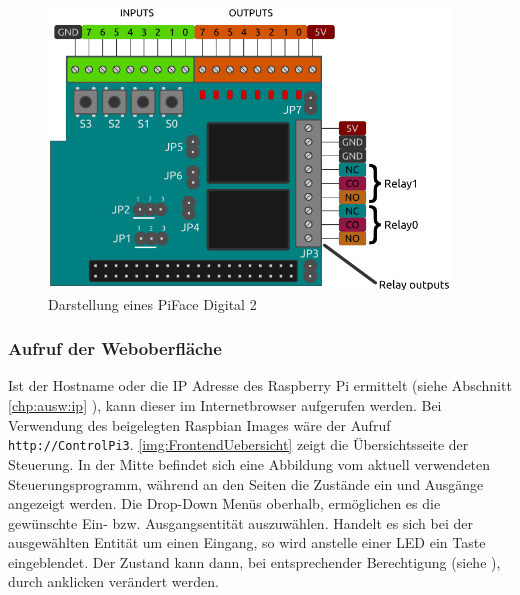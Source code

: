  
 \begin{figure}[H]
 	\begin{center}
 		\includegraphics[width=0.95\textwidth]{./images/pifacedigital2_diagram.png}
 		\caption[Darstellung eines PiFace Digital 2]{Darstellung eines PiFace Digital 2 \cite{URL:Pfd}}
 		\label{img:PiFaceDigital2}
 	\end{center} 
 \end{figure}	

 \subsubsection{Aufruf der Weboberfläche}\label{chp:FrontendUebersicht}
Ist der Hostname oder die IP Adresse des Raspberry Pi ermittelt (siehe Abschnitt \ref{chp:ausw:ip} ), kann dieser im Internetbrowser aufgerufen werden. Bei Verwendung des beigelegten Raspbian Images wäre der Aufruf \texttt{http://ControlPi3}. \autoref{img:FrontendUebersicht} zeigt die Übersichtsseite der Steuerung. In der Mitte befindet sich eine Abbildung vom aktuell verwendeten Steuerungsprogramm, während an den Seiten die Zustände ein und Ausgänge angezeigt werden. Die Drop-Down Menüs oberhalb, ermöglichen es die gewünschte Ein- bzw. Ausgangsentität auszuwählen. Handelt es sich bei der ausgewählten Entität um einen Eingang, so wird anstelle einer LED ein Taste eingeblendet. Der Zustand kann dann, bei entsprechender Berechtigung (siehe  ), durch anklicken verändert werden.  

